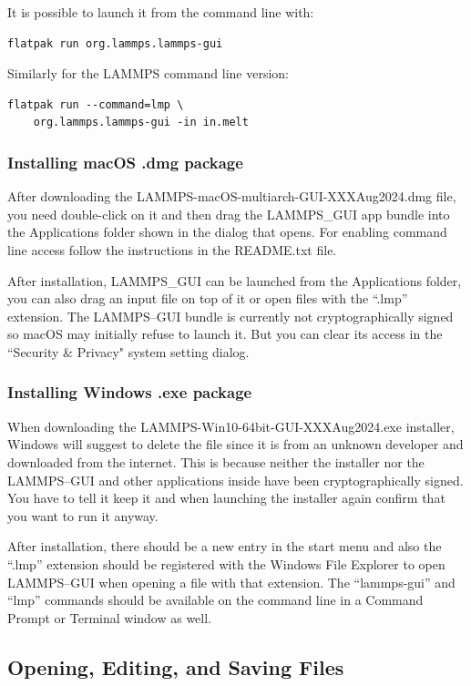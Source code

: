 \documentclass[9pt,tutorial]{livecoms}
\begin{document}
\begin{appendices}
It is possible to launch it from the command line with:
{\normalsize
\begin{verbatim}
flatpak run org.lammps.lammps-gui
\end{verbatim}
}
Similarly for the LAMMPS command line version:
{\normalsize
\begin{verbatim}
flatpak run --command=lmp \
    org.lammps.lammps-gui -in in.melt
\end{verbatim}
}

\subsubsection{Installing macOS .dmg package}

After downloading the LAMMPS-macOS-multiarch-GUI-XXXAug2024.dmg file, you
need double-click on it and then drag the LAMMPS\_GUI app bundle into the
Applications folder shown in the dialog that opens.  For enabling command line access
follow the instructions in the README.txt file.

After installation, LAMMPS\_GUI can be launched from the Applications folder,
you can also drag an input file on top of it or open files with the ``.lmp''
extension.  The LAMMPS--GUI bundle is currently not cryptographically signed
so macOS may initially refuse to launch it.  But you can clear its access in
the ``Security \& Privacy" system setting dialog.

\subsubsection{Installing Windows .exe package}

When downloading the LAMMPS-Win10-64bit-GUI-XXXAug2024.exe installer, Windows
will suggest to delete the file since it is from an unknown developer and
downloaded from the internet.  This is because neither the installer nor the
LAMMPS--GUI and other applications inside have been cryptographically signed.
You have to tell it keep it and when launching the installer again confirm
that you want to run it anyway.

After installation, there should be a new entry in the start menu and also
the ``.lmp'' extension should be registered with the Windows File Explorer
to open LAMMPS--GUI when opening a file with that extension. The ``lammps-gui''
and ``lmp'' commands should be available on the command line in a Command Prompt
or Terminal window as well.

\subsection{Opening, Editing, and Saving Files}


\end{appendices}
\end{document}
